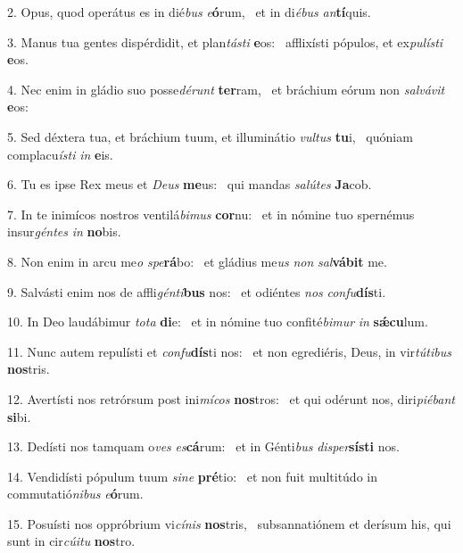 2. Opus, quod operátus es in dié\textit{bus} \textit{e}\textbf{ó}rum, \ast\  et in di\textit{é}\textit{bus} \textit{an}\textbf{tí}quis.\

3. Manus tua gentes dispérdidit, et plan\textit{tás}\textit{ti} \textbf{e}os: \ast\  afflixísti pópulos, et ex\textit{pu}\textit{lís}\textit{ti} \textbf{e}os.\

4. Nec enim in gládio suo posse\textit{dé}\textit{runt} \textbf{ter}ram, \ast\  et bráchium eórum non \textit{sal}\textit{vá}\textit{vit} \textbf{e}os:\

5. Sed déxtera tua, et bráchium tuum, et illuminátio \textit{vul}\textit{tus} \textbf{tu}i, \ast\  quóniam complacu\textit{ís}\textit{ti} \textit{in} \textbf{e}is.\

6. Tu es ipse Rex meus et \textit{De}\textit{us} \textbf{me}us: \ast\  qui mandas \textit{sa}\textit{lú}\textit{tes} \textbf{Ja}cob.\

7. In te inimícos nostros ventilá\textit{bi}\textit{mus} \textbf{cor}nu: \ast\  et in nómine tuo spernémus insur\textit{gén}\textit{tes} \textit{in} \textbf{no}bis.\

8. Non enim in arcu me\textit{o} \textit{spe}\textbf{rá}bo: \ast\  et gládius me\textit{us} \textit{non} \textit{sal}\textbf{vá}\textbf{bit} me.\

9. Salvásti enim nos de affli\textit{gén}\textit{ti}\textbf{bus} nos: \ast\  et odiéntes \textit{nos} \textit{con}\textit{fu}\textbf{dís}ti.\

10. In Deo laudábimur \textit{to}\textit{ta} \textbf{di}e: \ast\  et in nómine tuo confité\textit{bi}\textit{mur} \textit{in} \textbf{sǽ}\textbf{cu}lum.\

11. Nunc autem repulísti et \textit{con}\textit{fu}\textbf{dís}ti nos: \ast\  et non egrediéris, Deus, in vir\textit{tú}\textit{ti}\textit{bus} \textbf{nos}tris.\

12. Avertísti nos retrórsum post ini\textit{mí}\textit{cos} \textbf{nos}tros: \ast\  et qui odérunt nos, diri\textit{pi}\textit{é}\textit{bant} \textbf{si}bi.\

13. Dedísti nos tamquam o\textit{ves} \textit{es}\textbf{cá}rum: \ast\  et in Génti\textit{bus} \textit{di}\textit{sper}\textbf{sís}\textbf{ti} nos.\

14. Vendidísti pópulum tuum \textit{si}\textit{ne} \textbf{pré}tio: \ast\  et non fuit multitúdo in commutatió\textit{ni}\textit{bus} \textit{e}\textbf{ó}rum.\

15. Posuísti nos oppróbrium vi\textit{cí}\textit{nis} \textbf{nos}tris, \ast\  subsannatiónem et derísum his, qui sunt in cir\textit{cú}\textit{i}\textit{tu} \textbf{nos}tro.\

